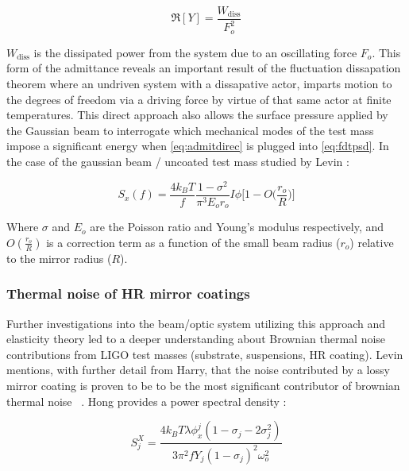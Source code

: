\begin{equation}\label{eq:admitdirec}
\Re[Y] = \frac{W_\mathrm{diss}}{F_o^2}
\end{equation}

\noindent $W_\mathrm{diss}$ is the dissipated power from the system due to an oscillating force $F_o$. This form of the admittance reveals an important result of the fluctuation dissapation theorem where an undriven system with a dissapative actor, imparts motion to the degrees of freedom via a driving force by virtue of that same actor at finite temperatures. This direct approach also allows the surface pressure applied by the Gaussian beam to interrogate which mechanical modes of the test mass impose a significant energy when \autoref{eq:admitdirec} is plugged into \autoref{eq:fdtpsd}. In the case of the gaussian beam / uncoated test mass studied by Levin \cite{levin:1998}:

\begin{equation}
S_x(f) = \frac{4 k_B T}{f} \frac{1-\sigma^2}{\pi^3 E_o r_o} I\phi \bigg[1- O\bigg( \frac{r_o}{R} \bigg)\bigg]
\end{equation}


\noindent Where $\sigma$ and $E_o$ are the Poisson ratio and Young's modulus respectively, and $O(\frac{r_o}{R})$ is a correction term as a function of the small beam radius ($r_o$) relative to the mirror radius ($R$).

\subsubsection*{Thermal noise of HR mirror coatings}
Further investigations into the beam/optic system utilizing this approach and elasticity theory led to a deeper understanding about Brownian thermal noise contributions from LIGO test masses (substrate, suspensions, HR coating). Levin mentions, with further detail from Harry, that the noise contributed by a lossy mirror coating is proven to be to be the most significant contributor of brownian thermal noise ~\cite{harry:2006}. Hong provides a power spectral density \cite{hong:2013}:

\begin{equation}
S_j^X = \frac{4k_B T \lambda \phi_x^j(1- \sigma_j - 2 \sigma_j^2)}{3 \pi^2 f Y_j (1-\sigma_j)^2 \omega_o^2}
\end{equation}

